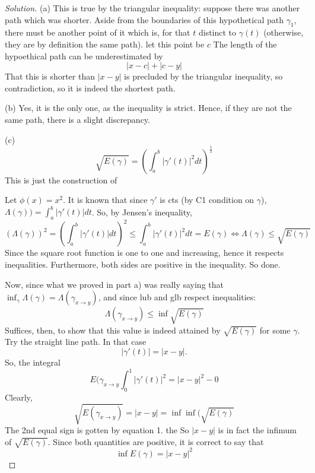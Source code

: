 \documentclass{article}
\newenvironment{solution}{\begin{proof}[Solution]}{\end{proof}}
\begin{document}
\begin{solution}
(a)
This is true by the triangular inequality: suppose there was another path which was shorter. Aside from the boundaries of this hypothetical path $\gamma_{1}$, there must be another point of it which is, for that $t$ distinct to $\gamma(t)$ (otherwise, they are by definition the same path). let this point be $c$ The length of the hypoethical path can be underestimated by \[
	|x-c| + |c-y|
\]
That this is shorter than $|x-y|$ is precluded by the triangular inequality, so contradiction, so it is indeed the shortest path.

(b) Yes, it is the only one, as the inequality is strict. Hence, if they are not the same path, there is a slight discrepancy.

(c) 
\[
	\sqrt{E(\gamma)} = (\int_{a}^{b}|\gamma'(t)|^{2}dt)^{\frac{1}{2}}  
\]
This is just the construction of 

Let $\phi(x) = x^{2}$. It is known that since $\gamma'$ is cts (by C1 condition on $\gamma$), $\Lambda (\gamma)) = \int_{a}^{b}|\gamma'(t)|dt$. So, by Jensen's inequality, \[
	(\Lambda(\gamma))^{2} = (\int_{a}^{b}|\gamma'(t)|dt)^{2} \leq \int_{a}^{b}|\gamma'(t)|^{2}dt = E(\gamma) \iff \Lambda(\gamma) \leq \sqrt{E(\gamma)} 
\] 
Since the square root function is one to one and increasing, hence it respects inequalities. Furthermore, both sides are positive in the inequality. So done.

Now, since what we proved in part a) was really saying that $\inf_{\gamma} \Lambda(\gamma) = \Lambda(\gamma_{x\rightarrow y})$, and since lub and glb respect inequalities: \begin{equation}
	\Lambda(\gamma_{x\rightarrow y}) \leq \inf \sqrt{E(\gamma)} 
\end{equation}
Suffices, then, to show that this value is indeed attained by $\sqrt{E(\gamma)}$ for some $\gamma$. Try the straight line path. In that case \[
	|\gamma'(t)| = |x-y|.
\]
So, the integral \[
	E(\gamma_{x \rightarrow y}\int_{0}^{1}|\gamma'(t)|^{2} = |x-y|^{2} - 0 
\]
Clearly, \[
	\sqrt{E(\gamma_{x \rightarrow y})} = |x-y| = \inf \inf(\sqrt{E(\gamma)}  
\]
The 2nd equal sign is gotten by equation 1. the So $|x-y|$ is in fact the infimum of $\sqrt{E(\gamma)}$. Since both quantities are positive, it is correct to say that \[
	\inf E(\gamma) = |x-y|^{2}
\]

\end{solution}
\end{document}
